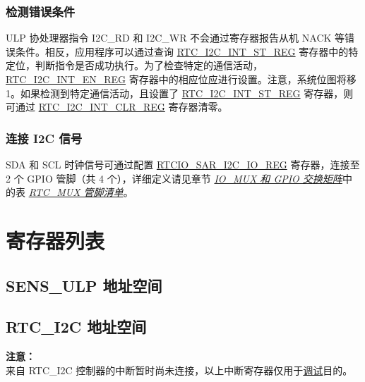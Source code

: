 \documentclass[main\_\_CN.tex]{subfiles}
\begin{document}
\subsubsection{检测错误条件} \label{paragraph:ULP-detecting-errors}


ULP 协处理器指令 I2C\_RD 和 I2C\_WR 不会通过寄存器报告从机 NACK 等错误条件。相反，应用程序可以通过查询 \hyperref[regdesc:RTCI2CINTSTREG]{RTC\_I2C\_INT\_ST\_REG} 寄存器中的特定位，判断指令是否成功执行。为了检查特定的通信活动，\hyperref[regdesc:RTCI2CINTENREG]{RTC\_I2C\_INT\_EN\_REG} 寄存器中的相应位应进行设置。注意，系统位图将移 1。如果检测到特定通信活动，且设置了 \hyperref[regdesc:RTCI2CINTSTREG]{RTC\_I2C\_INT\_ST\_REG} 寄存器，则可通过 \hyperref[regdesc:RTCI2CINTCLRREG]{RTC\_I2C\_INT\_CLR\_REG} 寄存器清零。

\subsubsection{连接 I2C 信号}\label{Connecting I2C Signals}

SDA 和 SCL 时钟信号可通过配置 \hyperref[regdesc:RTCIOSARI2CIOREG]{RTCIO\_SAR\_I2C\_IO\_REG} 寄存器，连接至 2 个 GPIO 管脚（共 4 个），详细定义请见章节 \hyperref[mod:iomuxgpio]{\it{IO\_MUX 和 GPIO 交换矩阵}}中的表 \hyperref[table:rtcmux pads]{\it{RTC\_MUX 管脚清单}}。

\hypertarget{ulp-reg-summ}{}
\section{寄存器列表}

\subsection{SENS\_ULP 地址空间}\label{sec:sens-ulp-reg-summ}



\subsection{RTC\_I2C 地址空间}

\label{subsection:RTC_I2C-register-summary}


\textbf{注意：} \\
来自 RTC\_I2C 控制器的中断暂时尚未连接，以上中断寄存器仅用于\hyperref[paragraph:ULP-detecting-errors]{调试}目的。
\end{document}
